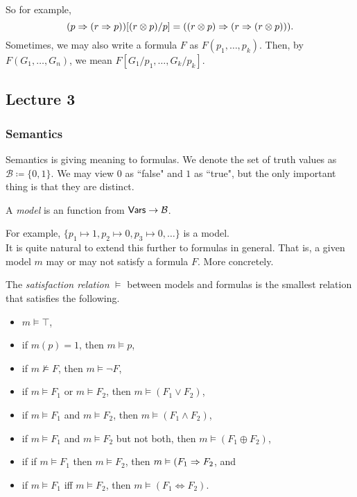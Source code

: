 So for example,
\[ (p\Rightarrow (r\Rightarrow p))[(r\otimes p)/p] = ((r\otimes p)\Rightarrow (r\Rightarrow (r\otimes p))). \]
Sometimes, we may also write a formula $F$ as $F(p_1,\ldots,p_k)$. Then, by $F(G_1,\ldots,G_n)$, we mean $F[G_1/p_1,\ldots,G_k/p_k]$.

\subsection{Lecture 3}

\subsubsection{Semantics}

Semantics is giving meaning to formulas. We denote the set of truth values as $\mathcal{B}\coloneqq\{0,1\}$. We may view $0$ as ``false" and $1$ as ``true", but the only important thing is that they are distinct.

\begin{definition}[Model]
A \textit{model} is an function from $\mathsf{Vars}\to\mathcal{B}$.
\end{definition}

For example, $\{p_1\mapsto 1, p_2\mapsto 0, p_3\mapsto 0,\ldots\}$ is a model. \\
It is quite natural to extend this further to formulas in general. That is, a given model $m$ may or may not satisfy a formula $F$. More concretely.

\begin{definition}
The \textit{satisfaction relation} $\vDash$ between models and formulas is the smallest relation that satisfies the following.
\begin{itemize}
    \item $m\vDash\top$,
    \item if $m(p)=1$, then $m\vDash p$,
    \item if $m\nvDash F$, then $m\vDash\neg F$,
    \item if $m\vDash F_1$ or $m\vDash F_2$, then $m\vDash (F_1\vee F_2)$,
    \item if $m\vDash F_1$ and $m\vDash F_2$, then $m\vDash (F_1\wedge F_2)$,
    \item if $m\vDash F_1$ and $m\vDash F_2$ but not both, then $m\vDash (F_1\oplus F_2)$,
    \item if if $m\vDash F_1$ then $m\vDash F_2$, then $m\vDash (F_1\Rightarrow F_2$, and
    \item if $m\vDash F_1$ iff $m\vDash F_2$, then $m\vDash (F_1\Leftrightarrow F_2)$.
\end{itemize}
\end{definition}

